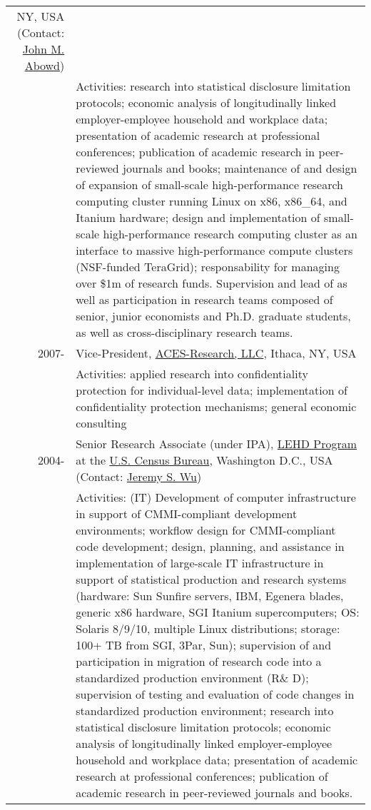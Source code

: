 \documentclass[10pt,letterpaper]{report}
\begin{document}
\begin{longtable}{rp{5in}}
NY, USA (Contact:
\href{mailto:john_abowd@cornell.edu}{John M. Abowd})\\%
         &Activities: research into statistical
         disclosure limitation protocols; economic analysis of
         longitudinally linked employer-employee household and workplace
         data; presentation of academic research at professional
         conferences; publication of academic research in peer-reviewed
         journals and books; maintenance of and design of expansion of small-scale high-performance
         research computing cluster running Linux on x86, x86\_64, and
         Itanium hardware; design and implementation of small-scale
         high-performance research computing cluster as an interface to
         massive  high-performance compute clusters (NSF-funded TeraGrid);
         responsability for managing over \$1m of research
         funds. Supervision and lead of as well as participation in research teams composed of senior, junior economists
         and Ph.D. graduate students, as well as cross-disciplinary
         research teams.\\
2007-    & Vice-President,
\href{http://www.aces-research.com}{ACES-Research, LLC}, Ithaca,
NY, USA\\%
         &Activities: applied research into confidentiality protection for
         individual-level data;  implementation of confidentiality
         protection mechanisms; general economic consulting\\
2004-    &Senior Research Associate (under IPA), \href{http://lehd.dsd.census.gov}{LEHD Program} at the
\href{http://www.census.gov}{U.S. Census Bureau}, Washington D.C., USA (Contact:
\href{mailto:jeremy.s.wu@census.gov}{Jeremy S. Wu})\\
         &Activities: (IT) Development of computer infrastructure in support of
         CMMI-compliant development environments; workflow design for
         CMMI-compliant code development; design, planning, and
         assistance in implementation of large-scale IT infrastructure in
         support of statistical production and research systems (hardware:
         Sun Sunfire servers, IBM, Egenera blades, generic x86 hardware,
         SGI Itanium supercomputers;
         OS: Solaris 8/9/10, multiple Linux distributions; storage: 100+ TB
         from SGI, 3Par, Sun); supervision of and participation in migration of
         research code into a standardized production environment (R\& D);
         supervision of testing and evaluation of code changes in
         standardized production environment; research into statistical
         disclosure limitation protocols; economic analysis of
         longitudinally linked employer-employee household and workplace
         data; presentation of academic research at professional
         conferences; publication of academic research in peer-reviewed
         journals and books.\\[.3cm]


\end{longtable}
\end{document}
